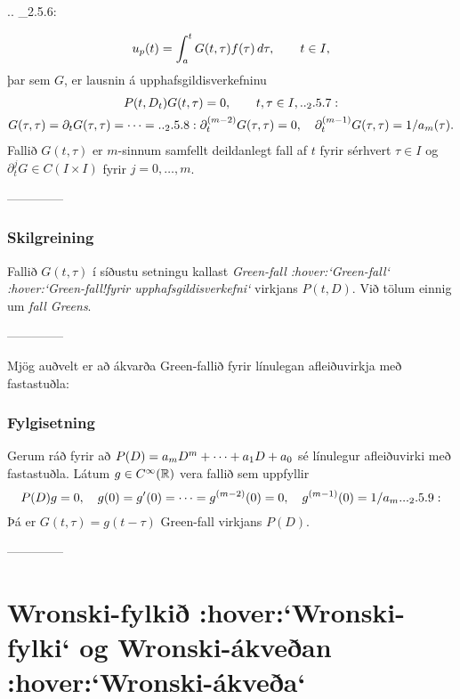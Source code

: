 .. _2.5.6:

\begin{equation*}u_p(t) = \int_a\sp t G(t,\tau)f(\tau) \, d\tau, \qquad t\in I,
\end{equation*}
þar sem $G$, er lausnin á  upphafsgildisverkefninu
 \begin{gather*}
P(t,D_t)G(t,\tau)=0,  \qquad t,\tau\in I,

.. _2.5.7:
\\
G(\tau,\tau)=\partial_tG(\tau,\tau)=\cdots=

.. _2.5.8:

\partial_t\sp{(m-2)}G(\tau,\tau)=0, \quad
\partial_t\sp{(m-1)}G(\tau,\tau)=1/a_m({\tau}). 
\end{gather*}
 Fallið $G(t,\tau)$ er $m$-sinnum samfellt deildanlegt fall af $t$
fyrir sérhvert $\tau\in I$ og 
$\partial_t^jG\in C(I\times I)$ fyrir $j=0,\dots,m$. 


--------------





\subsubsection{Skilgreining} Fallið $G(t,\tau)$ í síðustu setningu kallast {\it
Green-fall :hover:`Green-fall` :hover:`Green-fall!fyrir
upphafsgildisverkefni`}
virkjans $P(t,D)$.
 Við tölum einnig um {\it fall Greens}.


--------------



Mjög auðvelt er að ákvarða Green-fallið fyrir línulegan 
afleiðuvirkja með fasta\-stuðla:

\subsubsection{Fylgisetning}  Gerum ráð fyrir að 
$P(D)=a_mD\sp m+\cdots+a_1D+a_0$ sé línulegur afleiðuvirki með
fastastuðla.  Látum $g\in C\sp{\infty}({\mathbb R})$ vera fallið sem uppfyllir
 \begin{equation*}P(D)g=0, \quad g(0)=g\dash(0)=\cdots=g^{(m-2)}(0)=0, \quad
g^{(m-1)}(0)=1/a_m.

.. _2.5.9:

 \end{equation*}
Þá er $G(t,\tau)=g(t-\tau)$  Green-fall virkjans $P(D)$.


--------------




\section{Wronski-fylkið :hover:`Wronski-fylki` og
Wronski-ákveðan :hover:`Wronski-ákveða`}

